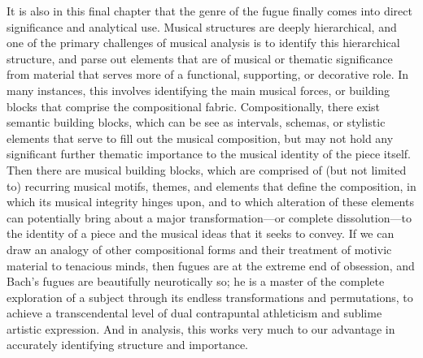 It is also in this final chapter that the genre of the fugue finally
comes into direct significance and analytical use. Musical structures
are deeply hierarchical, and one of the primary challenges of musical
analysis is to identify this hierarchical structure, and parse out
elements that are of musical or thematic significance from material that
serves more of a functional, supporting, or decorative role. In many
instances, this involves identifying the main musical forces, or
building blocks that comprise the compositional fabric. Compositionally,
there exist semantic building blocks, which can be see as intervals,
schemas, or stylistic elements that serve to fill out the musical
composition, but may not hold any significant further thematic
importance to the musical identity of the piece itself. Then there are
musical building blocks, which are comprised of (but not limited to)
recurring musical motifs, themes, and elements that define the
composition, in which its musical integrity hinges upon, and to which
alteration of these elements can potentially bring about a major
transformation---or complete dissolution---to the identity of a
piece and the musical ideas that it seeks to convey. If we can draw an
analogy of other compositional forms and their treatment of motivic
material to tenacious minds, then fugues are at the extreme end of
obsession, and Bach's fugues are beautifully neurotically so; he is a
master of the complete exploration of a subject through its endless
transformations and permutations, to achieve a transcendental level of
dual contrapuntal athleticism and sublime artistic expression. And in
analysis, this works very much to our advantage in accurately
identifying structure and importance.

